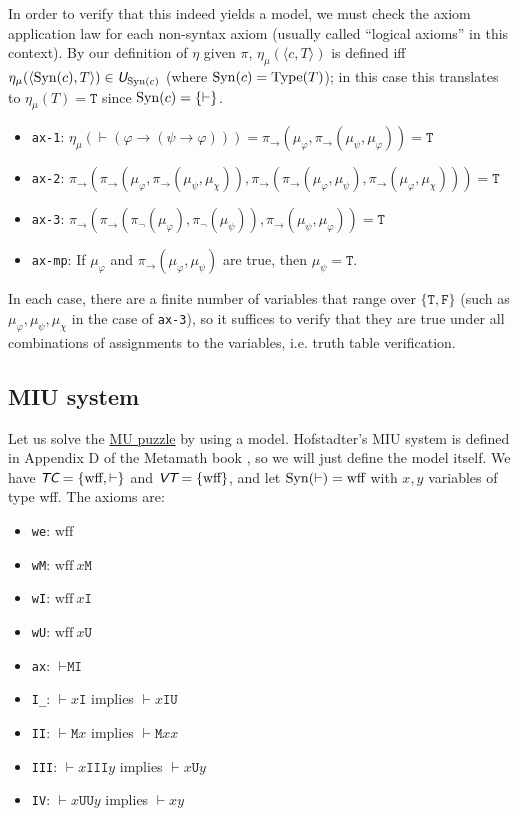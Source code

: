 \documentclass[runningheads,a4paper]{llncs}
\newcommand{\tc}{\textit{\textsf{TC}}} %
\newcommand{\vt}{\textit{\textsf{VT}}} %
\newcommand{\uv}{\textit{\textsf{U}}} %
\newcommand{\ang}[1]{\langle#1\rangle}
\newcommand{\vph}{\varphi}
\newcommand{\type}{{\rm Type}}
\newcommand{\syn}{{\rm Syn}}
\newcommand{\tT}{\texttt{T}}
\newcommand{\tF}{\texttt{F}}
\newcommand{\tM}{\texttt{M}}
\newcommand{\tI}{\texttt{I}}
\newcommand{\tU}{\texttt{U}}
\begin{document}
In order to verify that this indeed yields a model, we must check the axiom application law for each non-syntax axiom (usually called ``logical axioms'' in this context). By our definition of $\eta$ given $\pi$, $\eta_\mu(\ang{c,T})$ is defined iff $\eta_\mu(\ang{\syn(c),T})\in\uv_{\syn(c)}$ (where $\syn(c)=\type(T)$); in this case this translates to $\eta_\mu(T)=\tT$ since $\syn(c)=\{\vdash\}$.

\begin{itemize}
  \item \texttt{ax-1}: $\eta_\mu(\vdash(\vph\to(\psi\to\vph))) = \pi_\to(\mu_\vph,\pi_\to(\mu_\psi,\mu_\vph)) = \tT$
  \item \texttt{ax-2}: $\pi_\to(\pi_\to(\mu_\vph,  \pi_\to(\mu_\psi,\mu_\chi)), \pi_\to(\pi_\to(\mu_\vph,\mu_\psi), \pi_\to(\mu_\vph,\mu_\chi))) = \tT$
  \item \texttt{ax-3}: $\pi_\to(\pi_\to( \pi_\lnot(\mu_\vph),\pi_\lnot(\mu_\psi)), \pi_\to(\mu_\psi,\mu_\vph)) = \tT$
  \item \texttt{ax-mp}: If $\mu_\vph$ and $\pi_\to(\mu_\vph,\mu_\psi)$ are true, then $\mu_\psi = \tT$.
\end{itemize}

In each case, there are a finite number of variables that range over $\{\tT,\tF\}$ (such as $\mu_\vph,\mu_\psi,\mu_\chi$ in the case of \texttt{ax-3}), so it suffices to verify that they are true under all combinations of assignments to the variables, i.e. truth table verification.

\subsection{MIU system}\label{sec:miu}
Let us solve the \href{https://en.wikipedia.org/wiki/MU_puzzle}{MU puzzle} by using a model. Hofstadter's MIU system \cite{hofstadter} is defined in Appendix D of the Metamath book \cite{metamath}, so we will just define the model itself. We have $\tc=\{\textrm{wff},\vdash\}$ and $\vt=\{\textrm{wff}\}$, and let $\syn(\vdash)=\textrm{wff}$ with $x,y$ variables of type \textrm{wff}. The axioms are:

\begin{itemize}
  \item \texttt{we}: $\textrm{wff}$
  \item \texttt{wM}: $\textrm{wff}\ x\tM$
  \item \texttt{wI}: $\textrm{wff}\ x\tI$
  \item \texttt{wU}: $\textrm{wff}\ x\tU$
  \item \texttt{ax}: $\vdash \tM\tI$
  \item \texttt{I\_}: $\vdash x\tI$ implies $\vdash x\tI\tU$
  \item \texttt{II}: $\vdash \tM x$ implies $\vdash \tM xx$
  \item \texttt{III}: $\vdash x\tI\tI\tI y$ implies $\vdash x\tU y$
  \item \texttt{IV}: $\vdash x\tU\tU y$ implies $\vdash xy$
\end{itemize}
\end{document}
